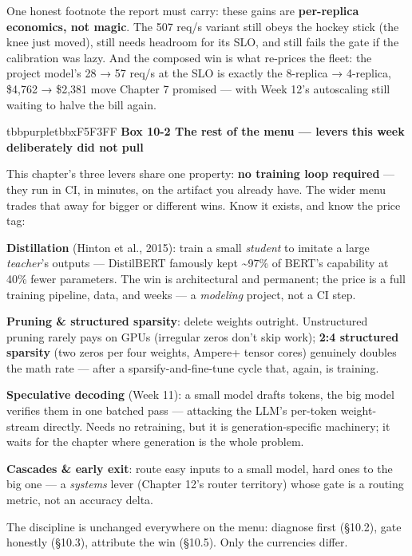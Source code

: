 One honest footnote the report must carry: these gains are \textbf{per-replica economics, not magic}. The 507 req/s variant still obeys the hockey stick (the knee just moved), still needs headroom for its SLO, and still fails the gate if the calibration was lazy. And the composed win is what re-prices the fleet: the project model's 28 → 57 req/s at the SLO is exactly the 8-replica → 4-replica, \$4,762 → \$2,381 move Chapter 7 promised — with Week 12's autoscaling still waiting to halve the bill again.

\begin{calloutbox}{tbbpurple}{tbbxF5F3FF}
{\normalsize\bfseries\color{tbbx5B21B6}Box 10-2  The rest of the menu — levers this week deliberately did not pull}\par\vspace{3pt}
This chapter's three levers share one property: \textbf{no training loop required} — they run in CI, in minutes, on the artifact you already have. The wider menu trades that away for bigger or different wins. Know it exists, and know the price tag:

\begin{tbbitemize}
  \item \textbf{Distillation} (Hinton et al., 2015): train a small \textit{student} to imitate a large \textit{teacher}'s outputs — DistilBERT famously kept \textasciitilde{}97\% of BERT's capability at 40\% fewer parameters. The win is architectural and permanent; the price is a full training pipeline, data, and weeks — a \textit{modeling} project, not a CI step.
  \item \textbf{Pruning \& structured sparsity}: delete weights outright. Unstructured pruning rarely pays on GPUs (irregular zeros don't skip work); \textbf{2:4 structured sparsity} (two zeros per four weights, Ampere+ tensor cores) genuinely doubles the math rate — after a sparsify-and-fine-tune cycle that, again, is training.
  \item \textbf{Speculative decoding} (Week 11): a small model drafts tokens, the big model verifies them in one batched pass — attacking the LLM's per-token weight-stream directly. Needs no retraining, but it is generation-specific machinery; it waits for the chapter where generation is the whole problem.
  \item \textbf{Cascades \& early exit}: route easy inputs to a small model, hard ones to the big one — a \textit{systems} lever (Chapter 12's router territory) whose gate is a routing metric, not an accuracy delta.
\end{tbbitemize}

The discipline is unchanged everywhere on the menu: diagnose first (§10.2), gate honestly (§10.3), attribute the win (§10.5). Only the currencies differ.
\end{calloutbox}

